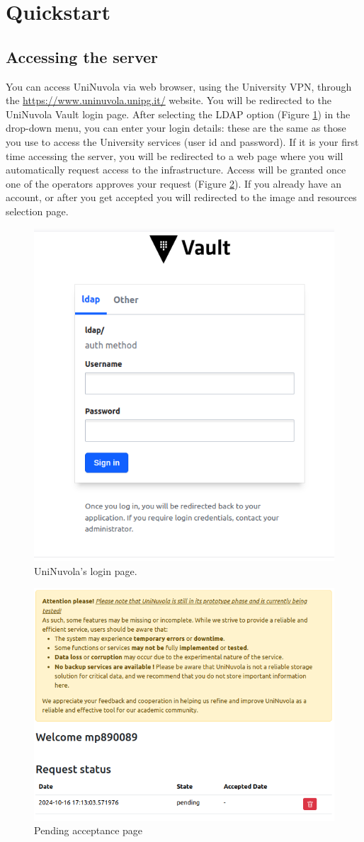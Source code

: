 \section{Quickstart}

\subsection{Accessing the server}

You can access UniNuvola via web browser, using the University VPN, through the
\href{https://www.uninuvola.unipg.it/}{https://www.uninuvola.unipg.it/} website. You will be redirected to the UniNuvola
Vault login page. After selecting the LDAP option (Figure \ref{fig:login}) in the drop-down menu, you can enter your
login details: these are the same as those you use to access the University services (user id and password). If it is
your first time accessing the server, you will be redirected to a web page  where you will automatically request access
to the infrastructure. Access will be granted once one of the operators approves your request (Figure
\ref{fig:pending}). If you already have an account, or after you get accepted you will redirected to the image and
resources selection page.


\begin{figure}[!ht]
    \centering
    \includegraphics[width=0.5\linewidth]{img/login_page.png}
    \caption{UniNuvola's login page.}
    \label{fig:login}
\end{figure}



\begin{figure}[!ht]
    \centering
    \includegraphics[width=0.5\linewidth]{img/request_page.png}
    \caption{Pending acceptance page}
    \label{fig:pending}
\end{figure}

